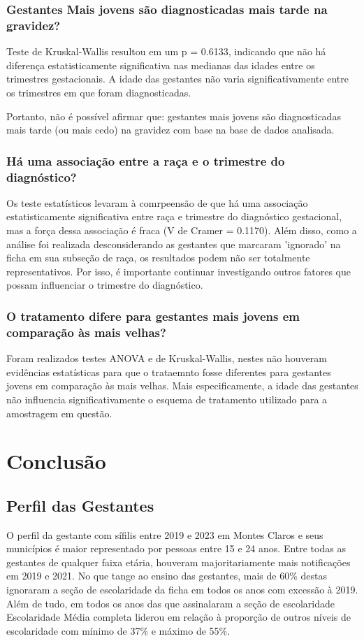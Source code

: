\documentclass[a4paper]{article}
\begin{document}
\begin{multicols}
\subsubsection{Gestantes Mais jovens são diagnosticadas mais tarde na gravidez?}

Teste de Kruskal-Wallis resultou em um p = 0.6133, indicando que não há diferença estatisticamente significativa nas medianas das idades entre os trimestres gestacionais. A idade das gestantes não varia significativamente entre os trimestres em que foram diagnosticadas.

Portanto, não é possível afirmar que: gestantes mais jovens são diagnosticadas mais tarde (ou mais cedo) na gravidez com base na base de dados analisada.


\subsubsection{Há uma associação entre a raça e o trimestre do diagnóstico?}
Os teste estatísticos levaram à comrpeensão de que há uma associação estatisticamente significativa entre raça e trimestre do diagnóstico gestacional, mas a força dessa associação é fraca (V de Cramer = 0.1170). Além disso, como a análise foi realizada desconsiderando as gestantes que marcaram 'ignorado' na ficha em sua subseção de raça, os resultados podem não ser totalmente representativos. Por isso, é importante continuar investigando outros fatores que possam influenciar o trimestre do diagnóstico.


\subsubsection{O tratamento difere para gestantes mais jovens em comparação às mais velhas?}
Foram realizados testes ANOVA e de Kruskal-Wallis, nestes não houveram evidências estatísticas para que o trataemnto fosse diferentes para gestantes jovens em comparação às mais velhas. Mais especificamente, a idade das gestantes não influencia significativamente o esquema de tratamento utilizado para a amostragem em questão.

\section{Conclusão}

\subsection{Perfil das Gestantes}
O perfil da gestante com sífilis entre 2019 e 2023 em Montes Claros e seus municípios é maior representado por pessoas entre 15 e 24 anos. Entre todas as gestantes de qualquer faixa etária, houveram majoritariamente mais notificações em 2019 e 2021. No que tange ao ensino das gestantes, mais de 60\% destas ignoraram a seção de escolaridade da ficha em todos os anos com excessão à 2019. Além de tudo, em todos os anos das que assinalaram a seção de escolaridade Escolaridade Média completa liderou em relação à proporção de outros níveis de escolaridade com mínimo de 37\% e máximo de 55\%. 


\end{multicols}
\end{document}
